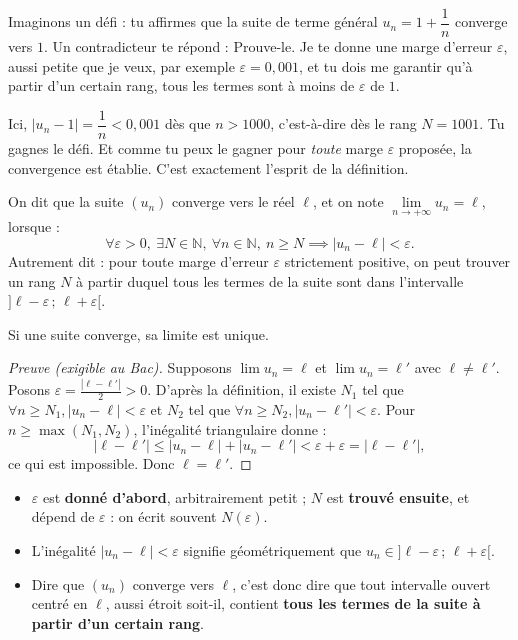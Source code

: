 \documentclass[11pt]{article}
\newcommand{\cle}[1]{{\popxbold\color{popdark}#1}}
\begin{document}
Imaginons un défi : tu affirmes que la suite de terme général $u_n = 1 + \dfrac{1}{n}$ converge vers $1$. Un contradicteur te répond : \og Prouve-le. Je te donne une marge d'erreur $\varepsilon$, aussi petite que je veux, par exemple $\varepsilon = 0{,}001$, et tu dois me garantir qu'à partir d'un certain rang, tous les termes sont à moins de $\varepsilon$ de $1$. \fg{}

Ici, $|u_n - 1| = \dfrac{1}{n} < 0{,}001$ dès que $n > 1000$, c'est-à-dire dès le rang $N = 1001$. Tu gagnes le défi. Et comme tu peux le gagner pour \emph{toute} marge $\varepsilon$ proposée, la convergence est établie. C'est exactement l'esprit de la définition.

\begin{definition}
On dit que la suite $(u_n)$ \cle{converge} vers le réel $\ell$, et on note $\lim\limits_{n \to +\infty} u_n = \ell$, lorsque :
\[
\forall \varepsilon > 0,\ \exists N \in \mathbb{N},\ \forall n \in \mathbb{N},\ n \geq N \implies |u_n - \ell| < \varepsilon.
\]
Autrement dit : pour toute marge d'erreur $\varepsilon$ strictement positive, on peut trouver un rang $N$ à partir duquel tous les termes de la suite sont dans l'intervalle $]\ell - \varepsilon\,;\,\ell + \varepsilon[$.
\end{definition}

\begin{propriete}
Si une suite converge, sa limite est unique.
\begin{proof}[Preuve (exigible au Bac)]
Supposons $\lim u_n = \ell$ et $\lim u_n = \ell'$ avec $\ell \neq \ell'$. Posons $\varepsilon = \frac{|\ell - \ell'|}{2} > 0$. D'après la définition, il existe $N_1$ tel que $\forall n \ge N_1, |u_n - \ell| < \varepsilon$ et $N_2$ tel que $\forall n \ge N_2, |u_n - \ell'| < \varepsilon$. Pour $n \ge \max(N_1, N_2)$, l'inégalité triangulaire donne :
\[
|\ell - \ell'| \le |u_n - \ell| + |u_n - \ell'| < \varepsilon + \varepsilon = |\ell - \ell'|,
\]
ce qui est impossible. Donc $\ell = \ell'$.
\end{proof}
\end{propriete}

\begin{aretenir}
\begin{itemize}
\item $\varepsilon$ est \textbf{donné d'abord}, arbitrairement petit ; $N$ est \textbf{trouvé ensuite}, et dépend de $\varepsilon$ : on écrit souvent $N(\varepsilon)$.
\item L'inégalité $|u_n - \ell| < \varepsilon$ signifie géométriquement que $u_n \in ]\ell - \varepsilon\,;\,\ell + \varepsilon[$.
\item Dire que $(u_n)$ converge vers $\ell$, c'est donc dire que tout intervalle ouvert centré en $\ell$, aussi étroit soit-il, contient \textbf{tous les termes de la suite à partir d'un certain rang}.
\end{itemize}
\end{aretenir}
\end{document}

